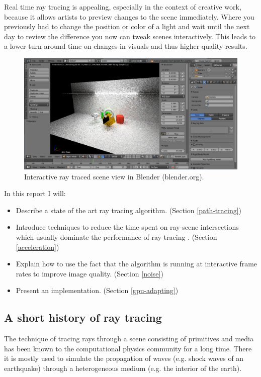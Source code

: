 \documentclass{ACGSeminar}
\begin{document}
Real time ray tracing is appealing, especially in the context of creative work, because it allows artists to preview changes to the scene immediately. Where you previously had to change the position or color of a light and wait until the next day to review the difference you now can tweak scenes interactively. This leads to a lower turn around time on changes in visuals and thus higher quality results.

\begin{figure}[htb!]
  \begin{centering}
    \includegraphics[width=12cm]{figures/blender_preview.png}\par
  \end{centering}
  \caption{Interactive ray traced scene view in Blender (blender.org).}
  \label{fig:blender_preview}
\end{figure}

In this report I will:
\begin{itemize}
\item Describe a state of the art ray tracing algorithm. (Section \ref{path-tracing})
\item Introduce techniques to reduce the time spent on ray-scene intersections which usually dominate the performance of ray tracing \cite{Whitted:1980}. (Section \ref{acceleration})
\item Explain how to use the fact that the algorithm is running at interactive frame rates to improve image quality. (Section \ref{noise})
\item Present an implementation. (Section \ref{gpu-adapting})
\end{itemize}


\subsection{A short history of ray tracing}
The technique of tracing rays through a scene consisting of primitives and media has been known to the computational physics community for a long time. There it is mostly used to simulate the propagation of waves (e.g. shock waves of an earthquake) through a heterogeneous medium (e.g. the interior of the earth). \cite{GJI:GJI93}
\end{document}
